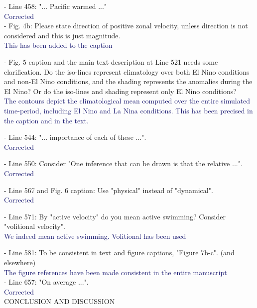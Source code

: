 \documentclass[12pt]{article}
\newcommand{\resp}[1]{\textcolor{MidnightBlue}{#1}}
\begin{document}
- Line 458: "... Pacific warmed ..."\\

\resp{Corrected} \\

- Fig. 4b: Please state direction of positive zonal velocity, unless direction is not considered and this is just magnitude.\\

\resp{This has been added to the caption}

- Fig. 5 caption and the main text description at Line 521 needs some clarification. Do the iso-lines represent climatology over both El Nino conditions and non-El Nino conditions, and the shading represents the anomalies during the El Nino? Or do the iso-lines and shading represent only El Nino conditions?\\

\resp{The contours depict the climatological mean computed over the entire simulated time-period,  including El Nino and La Nina conditions. This has been precised in the caption and in the text.}

- Line 544: "... importance of each of these ...".\\

\resp{Corrected}

- Line 550: Consider "One inference that can be drawn is that the relative ...".\\

\resp{Corrected}

- Line 567 and Fig. 6 caption: Use "physical" instead of "dynamical".\\

\resp{Corrected}

- Line 571: By "active velocity" do you mean active swimming? Consider "volitional velocity".\\

\resp{We indeed mean active swimming. Volitional has been used}

- Line 581: To be consistent in text and figure captions, "Figure 7b-c". (and elsewhere)\\

\resp{The figure references have been made consistent in the entire manuscript} \\

- Line 657: "On average ...".\\

\resp{Corrected} \\

CONCLUSION AND DISCUSSION\\
\end{document}
